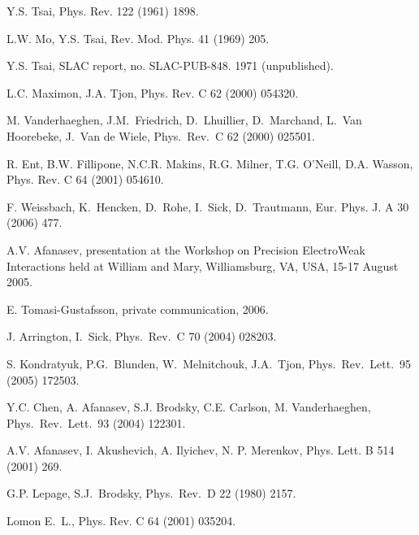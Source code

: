 \begin{thebibliography}{PPV06}
Y.S. Tsai, Phys. Rev. 122 (1961) 1898.

L.W. Mo, Y.S. Tsai, Rev. Mod. Phys. 41 (1969) 205.

Y.S. Tsai, SLAC report, no. SLAC-PUB-848. 1971 (unpublished).

L.C. Maximon, J.A. Tjon, Phys. Rev. C  62 (2000) 054320.

  M. Vanderhaeghen, J.M.~Friedrich, D.~Lhuillier, D.~Marchand, L.~Van Hoorebeke, J.~Van de Wiele,
  Phys.\ Rev.\ C 62 (2000) 025501.

R. Ent, B.W. Fillipone, N.C.R. Makins, R.G. Milner, T.G. O'Neill, 
D.A. Wasson, Phys. Rev. C 64 (2001) 054610.

  F. Weissbach, K.~Hencken, D.~Rohe, I.~Sick, D.~Trautmann,
  Eur. Phys. J. A 30 (2006) 477.

A.V. Afanasev, presentation at the 
Workshop on Precision ElectroWeak Interactions held at William and  Mary,
Williamsburg, VA, USA, 15-17 August 2005.   

 E. Tomasi-Gustafsson, private communication, 2006.

  J. Arrington, I.~Sick,
  Phys.\ Rev.\  C 70 (2004) 028203. 

S. Kondratyuk, P.G.~Blunden, W.~Melnitchouk, J.A.~Tjon,
  Phys.\ Rev.\ Lett.\  95 (2005) 172503.

Y.C. Chen, A. Afanasev, S.J. Brodsky, C.E. Carlson, M. Vanderhaeghen,
Phys.\ Rev.\ Lett.\  93 (2004) 122301.

A.V. Afanasev, I. Akushevich, A. Ilyichev, N. P. Merenkov, 
Phys. Lett. B 514 (2001) 269.

  G.P. Lepage, S.J.~Brodsky,
  Phys.\ Rev.\ D 22 (1980) 2157.

Lomon E.~L., Phys. Rev. C 64 (2001) 035204.


\end{thebibliography}
